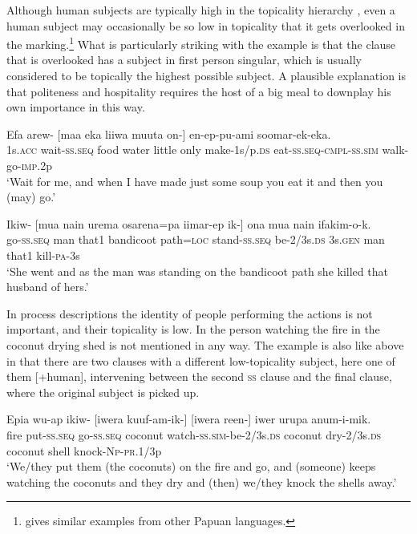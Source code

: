 Although human subjects are typically high in the topicality hierarchy \citep[364]{Givon1984}, even a human subject may occasionally be so low in topicality that it gets overlooked in the  marking.\footnote{\citet[236--237]{Reesink1983a} gives similar examples from other Papuan languages.} What is particularly striking with the example  is that the clause that is overlooked has a subject in first person singular, which is usually considered to be topically the highest possible subject. A plausible explanation is that politeness and hospitality requires the host of a big meal to downplay his own importance in this way. 

\ea%
\label{ex:8:x1477}
\gll Efa  arew-  [maa  eka  liiwa  muuta  on-] en-ep-pu-ami  soomar-ek-eka. \\
1s.\textsc{acc}  wait-\textsc{ss}.\textsc{seq} food water little only make-1s/p.\textsc{ds} eat-\textsc{ss}.\textsc{seq}-\textsc{cmpl}-\textsc{ss}.\textsc{sim} walk-go-\textsc{imp}.2p\\
\glt`Wait for me, and when I have made just some soup you eat it and then you (may) go.'
\z


\ea%
\label{ex:8:x1478}
\gll Ikiw-  [mua  nain  urema  osarena=pa  iimar-ep ik-] ona  mua  nain  ifakim-o-k. \\
go-\textsc{ss}.\textsc{seq} man  that1 bandicoot path=\textsc{loc} stand-\textsc{ss}.\textsc{seq} be-2/3s.\textsc{ds} 3s.\textsc{gen} man  that1 kill-\textsc{pa}-3s\\
\glt`She went and as the man was standing on the bandicoot path she killed that husband of hers.'
\z

  
In process descriptions the identity of people performing the actions is not important, and their topicality is low. In  the person watching the fire in the coconut drying shed is not mentioned in any way. The example is also like  above in that there are two clauses with a different low-topicality subject, here one of them [+human], intervening between the second \textsc{ss} clause and the final clause, where the original subject is picked up.

\ea%
\label{ex:8:x1481}
\gll Epia  wu-ap  ikiw- [iwera  kuuf-am-ik-] [iwera  reen-] iwer  urupa  anum-i-mik.  \\
fire  put-\textsc{ss}.\textsc{seq} go-\textsc{ss}.\textsc{seq} coconut  watch-\textsc{ss}.\textsc{sim}-be-2/3s.\textsc{ds} coconut  dry-2/3s.\textsc{ds} coconut shell knock-\textsc{Np}-\textsc{pr}.1/3p     \\
\glt`We/they put them (the coconuts) on the fire and go, and (someone) keeps watching the coconuts and they dry and (then) we/they knock the shells away.'
\z



